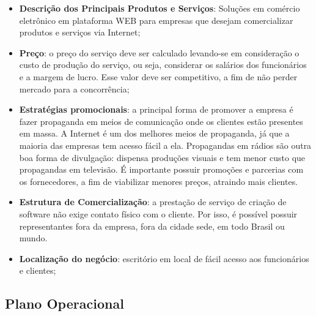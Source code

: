 \documentclass[12pt]{article}
\begin{document}
\begin{itemize}

	\item \textbf{Descrição dos Principais Produtos e Serviços}: Soluções em comércio eletrônico em plataforma WEB para empresas
	que desejam comercializar produtos e serviços via Internet;
	
	\item \textbf{Preço}: o preço do serviço deve ser calculado levando-se em consideração o custo de produção do serviço, ou seja,
	considerar os salários dos funcionários e a margem de lucro. Esse valor deve ser competitivo, a fim de não perder mercado para a
	concorrência;
	
	\item \textbf{Estratégias promocionais}: a principal forma de promover a empresa é fazer propaganda em meios de comunicação onde
	os clientes estão presentes em massa. A Internet é um dos melhores meios de propaganda, já que a maioria das empresas tem acesso
	fácil a ela. Propagandas em rádios são outra boa forma de divulgação: dispensa produções visuais e tem menor custo que propagandas
	em televisão. É importante possuir promoções e parcerias com os fornecedores, a fim de viabilizar menores preços, atraindo mais
	clientes.

	\item \textbf{Estrutura de Comercialização}: a prestação de serviço de criação de software não exige contato físico com o cliente.
	Por isso, é possível possuir representantes fora da empresa, fora da cidade sede, em todo Brasil ou mundo.
	
	\item \textbf{Localização do negócio}: escritório em local de fácil acesso aos funcionários e clientes;

\end{itemize}


\subsection{Plano Operacional}
\end{document}
